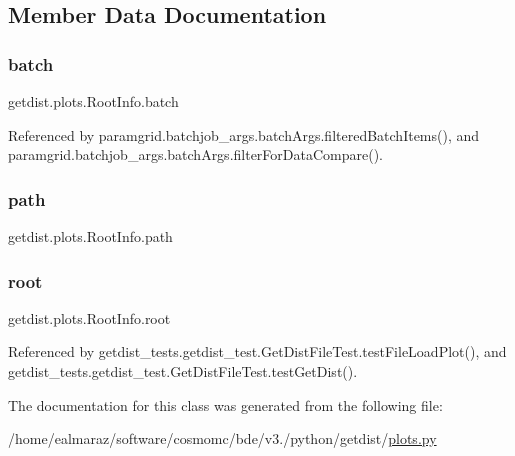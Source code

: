 \subsection{Member Data Documentation}
\mbox{\label{classgetdist_1_1plots_1_1RootInfo_ab25fd100bd82fad2632364a52d95e5ee}} 
\subsubsection{\texorpdfstring{batch}{batch}}
{\footnotesize\ttfamily getdist.\+plots.\+Root\+Info.\+batch}



Referenced by paramgrid.\+batchjob\+\_\+args.\+batch\+Args.\+filtered\+Batch\+Items(), and paramgrid.\+batchjob\+\_\+args.\+batch\+Args.\+filter\+For\+Data\+Compare().

\mbox{\label{classgetdist_1_1plots_1_1RootInfo_aef4fe3a99208232dfff95b1349ba37e7}} 
\subsubsection{\texorpdfstring{path}{path}}
{\footnotesize\ttfamily getdist.\+plots.\+Root\+Info.\+path}

\mbox{\label{classgetdist_1_1plots_1_1RootInfo_a0a9da48b51f158e5f0f25ceeebd159f4}} 
\subsubsection{\texorpdfstring{root}{root}}
{\footnotesize\ttfamily getdist.\+plots.\+Root\+Info.\+root}



Referenced by getdist\+\_\+tests.\+getdist\+\_\+test.\+Get\+Dist\+File\+Test.\+test\+File\+Load\+Plot(), and getdist\+\_\+tests.\+getdist\+\_\+test.\+Get\+Dist\+File\+Test.\+test\+Get\+Dist().



The documentation for this class was generated from the following file\+:\begin{DoxyCompactItemize}
\item 
/home/ealmaraz/software/cosmomc/bde/v3./python/getdist/\mbox{\hyperlink{plots_8py}{plots.\+py}}\end{DoxyCompactItemize}
